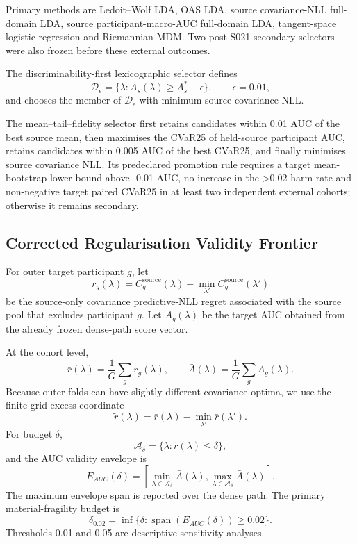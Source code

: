 Primary methods are Ledoit--Wolf LDA, OAS LDA, source covariance-NLL
full-domain LDA, source participant-macro-AUC full-domain LDA,
tangent-space logistic regression and Riemannian MDM. Two post-S021
secondary selectors were also frozen before these external outcomes.

The discriminability-first lexicographic selector defines
\[
 \mathcal D_\epsilon=
 \{\lambda:A_s(\lambda)\ge A_s^*-\epsilon\},
 \qquad \epsilon=0.01,
\]
and chooses the member of \(\mathcal D_\epsilon\) with minimum source
covariance NLL.

The mean--tail--fidelity selector first retains candidates within 0.01 AUC of
the best source mean, then maximises the CVaR25 of held-source participant
AUC, retains candidates within 0.005 AUC of the best CVaR25, and finally
minimises source covariance NLL. Its predeclared promotion rule requires a
target mean-bootstrap lower bound above -0.01 AUC, no increase in the
>0.02 harm rate and non-negative target paired CVaR25 in at least two
independent external cohorts; otherwise it remains secondary.

\subsection{Corrected Regularisation Validity Frontier}
For outer target participant \(g\), let
\[
 r_g(\lambda)
 =
 C_g^{\mathrm{source}}(\lambda)
 -
 \min_{\lambda'}C_g^{\mathrm{source}}(\lambda')
\]
be the source-only covariance predictive-NLL regret associated with the
source pool that excludes participant \(g\). Let \(A_g(\lambda)\) be the
target AUC obtained from the already frozen dense-path score vector.

At the cohort level,
\[
 \bar r(\lambda)=\frac{1}{G}\sum_g r_g(\lambda),
 \qquad
 \bar A(\lambda)=\frac{1}{G}\sum_g A_g(\lambda).
\]
Because outer folds can have slightly different covariance optima, we use the
finite-grid excess coordinate
\[
 \widetilde r(\lambda)=
 \bar r(\lambda)-\min_{\lambda'}\bar r(\lambda').
\]
For budget \(\delta\),
\[
 \mathcal A_\delta=
 \{\lambda:\widetilde r(\lambda)\le\delta\},
\]
and the AUC validity envelope is
\[
 E_{AUC}(\delta)=
 \left[
 \min_{\lambda\in\mathcal A_\delta}\bar A(\lambda),
 \max_{\lambda\in\mathcal A_\delta}\bar A(\lambda)
 \right].
\]
The maximum envelope span is reported over the dense path. The primary
material-fragility budget is
\[
 \delta_{0.02}
 =
 \inf\{\delta:
 \operatorname{span}(E_{AUC}(\delta))\ge0.02\}.
\]
Thresholds 0.01 and 0.05 are descriptive sensitivity analyses.

